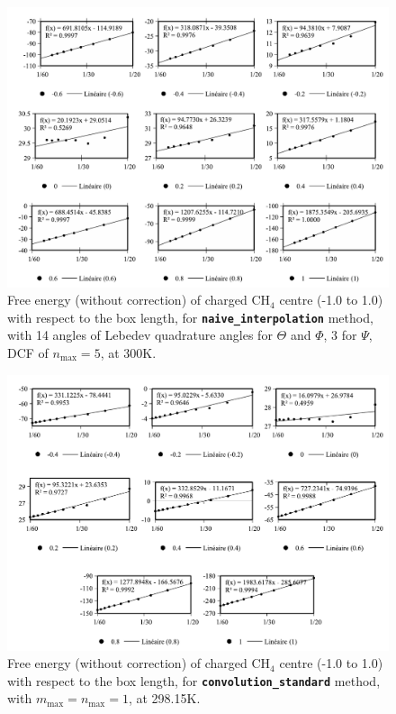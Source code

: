 \begin{figure}[!th]
\begin{centering}
\includegraphics[width=0.95\columnwidth]{_figure/results/ch4_nmax5_inter}
\par\end{centering}
\caption{Free energy (without correction) of charged $\mathrm{C}\mathrm{H}_{4}$
centre (-1.0 to 1.0) with respect to the box length, for \texttt{\textbf{naive\_interpolation}}
method, with 14 angles of Lebedev quadrature angles for $\Theta$
and $\Phi$, 3 for $\Psi$, DCF of $n_{\max}=5$, at 300K.\label{fig:ch4_nmax5_inter}}
\end{figure}

\begin{figure}[!bh]
\begin{centering}
\includegraphics[width=0.95\columnwidth]{_figure/results/ch4_nmax1_new}
\par\end{centering}
\caption{Free energy (without correction) of charged $\mathrm{C}\mathrm{H}_{4}$
centre (-1.0 to 1.0) with respect to the box length, for \texttt{\textbf{convolution\_standard}}
method, with $m_{\max}=n_{\max}=1$, at 298.15K.\label{fig:ch4_nmax1_new}}
\end{figure}

